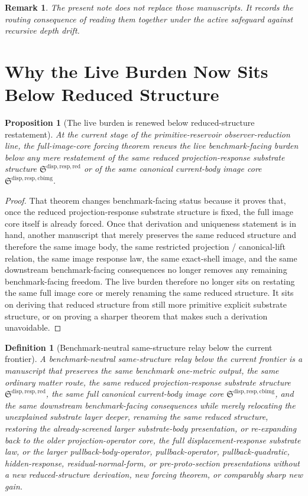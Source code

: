\documentclass[11pt]{article}
\newcommand{\ReducedStructure}{\mathfrak S^{\mathrm{disp,resp,red}}}
\newcommand{\CurrentBodyImageCore}{\mathfrak S^{\mathrm{disp,resp,cbimg}}}
\newtheorem{definition}{Definition}
\newtheorem{proposition}{Proposition}
\newtheorem{remark}{Remark}
\begin{document}
\begin{remark}
The present note does not replace those manuscripts. It records the routing consequence of reading them together under the active safeguard against recursive depth drift.
\end{remark}

\section{Why the Live Burden Now Sits Below Reduced Structure}

\begin{proposition}[The live burden is renewed below reduced-structure restatement]
At the current stage of the primitive-reservoir observer-reduction line, the full-image-core forcing theorem renews the live benchmark-facing burden below any mere restatement of the same reduced projection-response substrate structure \(\ReducedStructure\) or of the same canonical current-body image core \(\CurrentBodyImageCore\).
\end{proposition}

\begin{proof}
That theorem changes benchmark-facing status because it proves that, once the reduced projection-response substrate structure is fixed, the full image core itself is already forced. Once that derivation and uniqueness statement is in hand, another manuscript that merely preserves the same reduced structure and therefore the same image body, the same restricted projection / canonical-lift relation, the same image response law, the same exact-shell image, and the same downstream benchmark-facing consequences no longer removes any remaining benchmark-facing freedom. The live burden therefore no longer sits on restating the same full image core or merely renaming the same reduced structure. It sits on deriving that reduced structure from still more primitive explicit substrate structure, or on proving a sharper theorem that makes such a derivation unavoidable.
\end{proof}

\begin{definition}[Benchmark-neutral same-structure relay below the current frontier]
A \emph{benchmark-neutral same-structure relay below the current frontier} is a manuscript that preserves the same benchmark one-metric output, the same ordinary matter route, the same reduced projection-response substrate structure \(\ReducedStructure\), the same full canonical current-body image core \(\CurrentBodyImageCore\), and the same downstream benchmark-facing consequences while merely relocating the unexplained substrate layer deeper, renaming the same reduced structure, restoring the already-screened larger substrate-body presentation, or re-expanding back to the older projection-operator core, the full displacement-response substrate law, or the larger pullback-body-operator, pullback-operator, pullback-quadratic, hidden-response, residual-normal-form, or pre-proto-section presentations without a new reduced-structure derivation, new forcing theorem, or comparably sharp new gain.
\end{definition}
\end{document}
